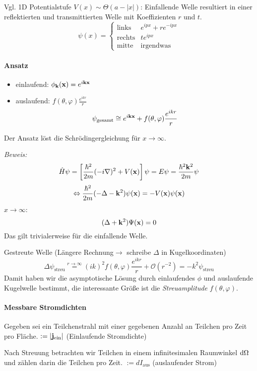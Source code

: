 \documentclass[11pt,a4paper]{report}
\begin{document}
Vgl. 1D Potentialstufe $V(x)\sim \Theta (a-|x|)$: Einfallende Welle resultiert in einer reflektierten und transmittierten Welle mit Koeffizienten $r$ und $t$.
$$\psi (x) = \left\{ \begin{matrix}
\text{links} & e^{ipx} + re^{-ipx} \\
\text{rechts} & te^{ipx} \\
\text{mitte} & \text{irgendwas}
\end{matrix}\right.$$

\paragraph{Ansatz} 
\begin{itemize}
\item einlaufend: $\phi_{\mathbf{k}}(\mathbf{x} )=e^{i\mathbf{k}\mathbf{x}}$
\item auslaufend: $ f(\theta ,\varphi ) \frac{e^{ikr}}{r}$
$$\psi_\text{gesamt} \cong e^{i\mathbf{k}\mathbf{x}} + f(\theta ,\varphi ) \frac{e^{ikr}}{r}$$
\end{itemize}
Der Ansatz löst die Schrödingergleichung für $x\rightarrow\infty$.\par 
\textit{Beweis:}
$$\hat{H}\psi = \left[\frac{\hbar^2}{2m} (-i\nabla )^2 + V(\mathbf{x})\right]\psi = E\psi=\frac{\hbar^2\mathbf{k}^2}{2m}\psi$$
$$\Leftrightarrow \frac{\hbar^2}{2m}(-\Delta -\mathbf{k}^2 )\psi (\mathbf{x}) = -V(\mathbf{x})\psi (\mathbf{x})$$
$x\rightarrow\infty$:
$$(\Delta + \mathbf{k}^2 )\Psi (\mathbf{x} )=0$$
Das gilt trivialerweise für die einfallende Welle.\par 
Gestreute Welle (Längere Rechnung$\rightarrow$ schreibe $\Delta$ in Kugelkoordinaten)
$$\Delta\psi_\text{streu} \overset{r\rightarrow\infty }{=} (ik)^2f(\theta ,\varphi ) \frac{e^{ikr}}{r}+\mathcal{O}(r^{-2}) = -k^2\psi_\text{streu} $$
Damit haben wir die asymptotische Lösung durch einlaufendes $\phi$ und auslaufende Kugelwelle bestimmt, die interessante Größe ist die \textit{Streuamplitude} $f(\theta ,\varphi )$.\par 

\newcommand{\vj}{\vf{j}}

\paragraph{Messbare Stromdichten} Gegeben sei ein Teilchenstrahl mit einer gegebenen Anzahl an Teilchen pro Zeit pro Fläche. $:=|\vj_\text{ein}|$ (Einlaufende Stromdichte) \par 
Nach Streuung betrachten wir Teilchen in einem infinitesimalen Raumwinkel $\mathrm{d}\Omega$ und zählen darin die Teilchen pro Zeit. $:=dI_\text{aus}$ (auslaufender Strom)
\end{document}
